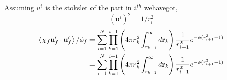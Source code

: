 Assuming $u^i$ is the stokslet of the part in $i^{th}$ wehavegot, 
\begin{equation}
    (\textbf{u}^i )^2
     = 1/r_i^2
\end{equation}
\begin{align}
    \left<\chi_f \textbf{u}_f'\cdot \textbf{u}_f'\right>/ \phi_f
    &=
    \sum_{i=1}^N 
    \prod_{k=1}^{i+1} \left(
        4\pi r_k^2
        \int_{r_{k-1}}^{\infty}
        d\textbf{r}_k 
    \right)
    \frac{1}{r_{i+1}^2}
    e^{-\phi(r_{i+1}^3- 1)}\\
    &=
    \sum_{i=1}^N 
    \prod_{k=1}^{i+1} \left(
        4\pi r_k^2
        \int_{r_{k-1}}^{\infty}
        d\textbf{r}_k 
    \right)
    \frac{1}{r_{i+1}^2}
    e^{-\phi(r_{i+1}^3- 1)}\\
\end{align}



